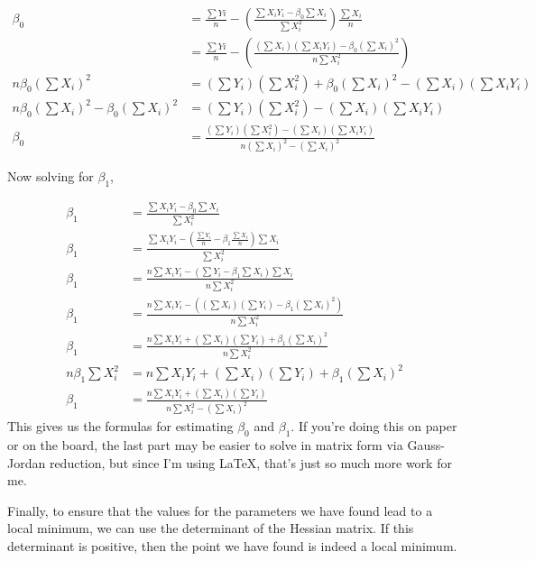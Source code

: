 \documentclass[12pt,a4paper]{article}
\begin{document}
\begin{align*}
    \beta_0 &= \frac{\sum Yi}{n} - \left(\frac{\sum{X_iY_i} -\beta_0\sum{X_i}}{\sum{X_i^2}}\right)\frac{\sum X_i}{n} \\
    &= \frac{\sum Yi}{n} - \left(\frac{(\sum X_i)(\sum{X_iY_i}) -\beta_0(\sum{X_i})^2}{n\sum{X_i^2}}\right)\\
    n\beta_0\left(\sum{X_i}\right)^2 &= \left(\sum{Y_i}\right) \left(\sum{X_i^2}\right) + \beta_0\left(\sum{X_i}\right)^2 - \left(\sum X_i\right)\left(\sum{X_iY_i}\right) \\
    n\beta_0\left(\sum{X_i}\right)^2  - \beta_0\left(\sum{X_i}\right)^2&= \left(\sum{Y_i}\right) \left(\sum{X_i^2}\right) - \left(\sum X_i\right)\left(\sum{X_iY_i}\right) \\
    \beta_0 &= \frac{\left(\sum{Y_i}\right) \left(\sum{X_i^2}\right) - \left(\sum X_i\right)\left(\sum{X_iY_i}\right)}{n\left(\sum{X_i}\right)^2  - \left(\sum{X_i}\right)^2}
\end{align*}

Now solving for $\beta_1$, 

\begin{align*}
    \beta_1 &=  \frac{\sum{X_iY_i} -\beta_0\sum{X_i}}{\sum{X_i^2}} \\
    \beta_1 &=  \frac{\sum{X_iY_i} -\left(\frac{\sum Y_i}{n} - \beta_1 \frac{\sum{X_i}}{n}\right)\sum{X_i}}{\sum{X_i^2}} \\
    \beta_1 &=  \frac{n\sum{X_iY_i} -\left(\sum Y_i - \beta_1 \sum{X_i}\right)\sum{X_i}}{n\sum{X_i^2}} \\
    \beta_1 &=  \frac{n\sum{X_iY_i} -\left((\sum{X_i})(\sum Y_i) - \beta_1 (\sum{X_i})^2\right)}{n\sum{X_i^2}} \\
    \beta_1 &=  \frac{n\sum{X_iY_i} + (\sum{X_i})(\sum Y_i) + \beta_1 (\sum{X_i})^2}{n\sum{X_i^2}} \\
    n\beta_1\sum{X_i^2} &=n\sum{X_iY_i} + \left(\sum{X_i}\right)\left(\sum Y_i\right) + \beta_1 \left(\sum{X_i}\right)^2 \\
    \beta_1 &= \frac{n\sum{X_iY_i} + \left(\sum{X_i}\right)\left(\sum Y_i\right)}{n\sum{X_i^2} - \left(\sum{X_i}\right)^2}
\end{align*}
This gives us the formulas for estimating $\beta_0$ and $\beta_1$. If you're doing this on paper or on the board, the last part may be easier to solve in matrix form via Gauss-Jordan reduction, but since I'm using LaTeX, that's just so much more work for me.

Finally, to ensure that the values for the parameters we have found lead to a local minimum, we can use the determinant of the Hessian matrix. If this determinant is positive, then the point we have found is indeed a local minimum.
\end{document}
